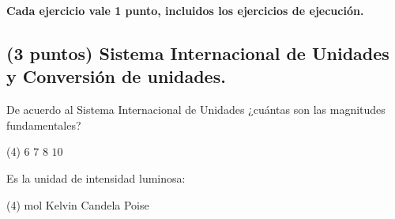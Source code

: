 \documentclass[12pt, letter]{exam}
\begin{document}


\setcounter{page}{3}

\begin{center}
\textbf{Cada ejercicio vale 1 punto, incluidos los ejercicios de ejecución.}
\end{center}

\begin{questions}
    
    \section{(3 puntos) Sistema Internacional de Unidades y Conversión de unidades.}
    
    \question De acuerdo al Sistema Internacional de Unidades ¿cuántas son las magnitudes fundamentales?
    \begin{tasks}(4)
        \task $6$
        \task $7$
        \task $8$
        \task $10$
    \end{tasks}
    \question Es la unidad de intensidad luminosa:
    \begin{tasks}(4)
    \task mol
    \task Kelvin
    \task Candela
    \task Poise
    \end{tasks}



\end{questions}
\end{document}
